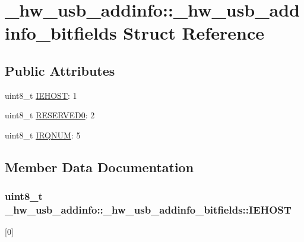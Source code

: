 \hypertarget{struct__hw__usb__addinfo_1_1__hw__usb__addinfo__bitfields}{}\section{\+\_\+hw\+\_\+usb\+\_\+addinfo\+:\+:\+\_\+hw\+\_\+usb\+\_\+addinfo\+\_\+bitfields Struct Reference}
\label{struct__hw__usb__addinfo_1_1__hw__usb__addinfo__bitfields}
\subsection*{Public Attributes}
\begin{DoxyCompactItemize}
\item 
uint8\+\_\+t \hyperlink{struct__hw__usb__addinfo_1_1__hw__usb__addinfo__bitfields_a20d2ec6b83c1f59a54e6f835fd3d9c6f}{I\+E\+H\+O\+ST}\+: 1
\item 
uint8\+\_\+t \hyperlink{struct__hw__usb__addinfo_1_1__hw__usb__addinfo__bitfields_a460cce60c4801f6073624bb7126dfc54}{R\+E\+S\+E\+R\+V\+E\+D0}\+: 2
\item 
uint8\+\_\+t \hyperlink{struct__hw__usb__addinfo_1_1__hw__usb__addinfo__bitfields_a877bee0eb7a8ae88fd3c253e5842ca65}{I\+R\+Q\+N\+UM}\+: 5
\end{DoxyCompactItemize}


\subsection{Member Data Documentation}
\subsubsection[{\texorpdfstring{I\+E\+H\+O\+ST}{IEHOST}}]{\setlength{\rightskip}{0pt plus 5cm}uint8\+\_\+t \+\_\+hw\+\_\+usb\+\_\+addinfo\+::\+\_\+hw\+\_\+usb\+\_\+addinfo\+\_\+bitfields\+::\+I\+E\+H\+O\+ST}\hypertarget{struct__hw__usb__addinfo_1_1__hw__usb__addinfo__bitfields_a20d2ec6b83c1f59a54e6f835fd3d9c6f}{}\label{struct__hw__usb__addinfo_1_1__hw__usb__addinfo__bitfields_a20d2ec6b83c1f59a54e6f835fd3d9c6f}
\mbox{[}0\mbox{]} 
